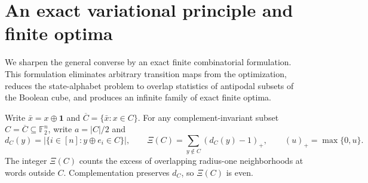 \documentclass[11pt,a4paper]{article}
\newcommand{\F}{\mathbb F_2}
\begin{document}
\section{An exact variational principle and finite optima}\label{sec:variational}

We sharpen the general converse by an exact finite combinatorial formulation. This formulation eliminates arbitrary transition maps from the optimization, reduces the state-alphabet problem to overlap statistics of antipodal subsets of the Boolean cube, and produces an infinite family of exact finite optima.

Write $\bar x=x\oplus\mathbf1$ and $\overline C=\{\bar x:x\in C\}$. For any complement-invariant subset $C=\overline C\subseteq\F^n$, write $a=|C|/2$ and
\[
 d_C(y)=|\{i\in[n]:y\oplus e_i\in C\}|,\qquad
 \Xi(C)=\sum_{y\notin C}(d_C(y)-1)_+,
 \qquad (u)_+=\max\{0,u\}.
\]
The integer $\Xi(C)$ counts the excess of overlapping radius-one neighborhoods at words outside $C$. Complementation preserves $d_C$, so $\Xi(C)$ is even.
\end{document}
